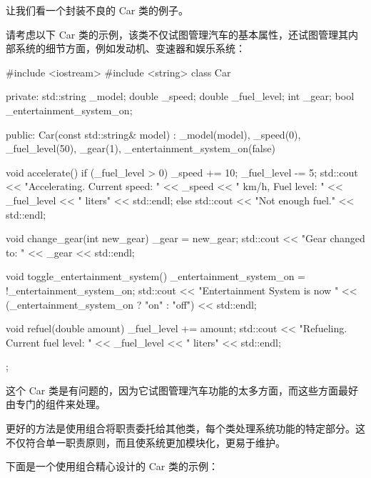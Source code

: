 让我们看一个封装不良的 Car 类的例子。

请考虑以下 Car 类的示例，该类不仅试图管理汽车的基本属性，还试图管理其内部系统的细节方面，例如发动机、变速器和娱乐系统：

\begin{cpp}
#include <iostream>
#include <string>
class Car {
private:
    std::string _model;
    double _speed;
    double _fuel_level;
    int _gear;
    bool _entertainment_system_on;

public:
    Car(const std::string& model) : _model(model), _speed(0), _fuel_level(50), _gear(1), _entertainment_system_on(false) {}

    void accelerate() {
        if (_fuel_level > 0) {
            _speed += 10;
            _fuel_level -= 5;
            std::cout << "Accelerating. Current speed: " << _speed <<
            " km/h, Fuel level: " << _fuel_level << " liters" << std::endl;
        } else {
            std::cout << "Not enough fuel." << std::endl;
        }
    }

    void change_gear(int new_gear) {
        _gear = new_gear;
        std::cout << "Gear changed to: " << _gear << std::endl;
    }

    void toggle_entertainment_system() {
        _entertainment_system_on = !_entertainment_system_on;
        std::cout << "Entertainment System is now " << (_entertainment_system_on ? "on" : "off") << std::endl;
    }

    void refuel(double amount) {
        _fuel_level += amount;
        std::cout << "Refueling. Current fuel level: " << _fuel_level << " liters" << std::endl;
    }
};
\end{cpp}

这个 Car 类是有问题的，因为它试图管理汽车功能的太多方面，而这些方面最好由专门的组件来处理。


更好的方法是使用组合将职责委托给其他类，每个类处理系统功能的特定部分。这不仅符合单一职责原则，而且使系统更加模块化，更易于维护。

下面是一个使用组合精心设计的 Car 类的示例：

